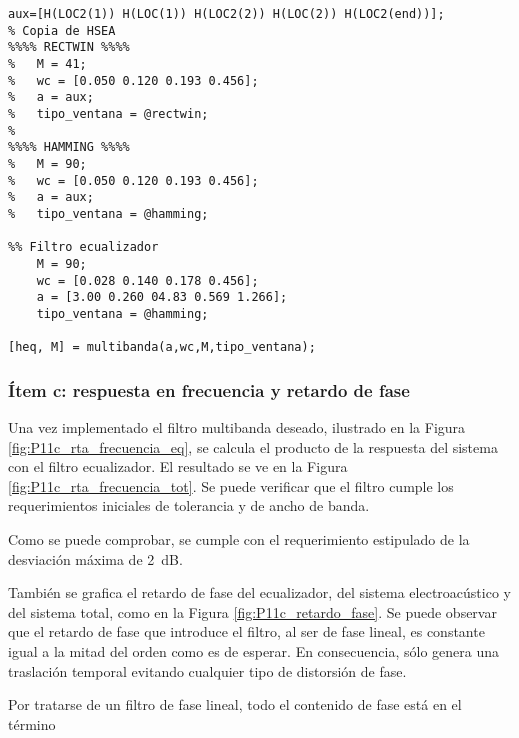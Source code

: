 
	\begin{lstlisting}
aux=[H(LOC2(1)) H(LOC(1)) H(LOC2(2)) H(LOC(2)) H(LOC2(end))];
% Copia de HSEA
%%%% RECTWIN %%%%
%	M = 41;
%	wc = [0.050 0.120 0.193 0.456];
%	a = aux;
%	tipo_ventana = @rectwin;
%
%%%% HAMMING %%%%
%	M = 90;
%	wc = [0.050 0.120 0.193 0.456];
%	a = aux;
%	tipo_ventana = @hamming;

%% Filtro ecualizador
	M = 90;
	wc = [0.028 0.140 0.178 0.456];
	a = [3.00 0.260 04.83 0.569 1.266];
	tipo_ventana = @hamming;

[heq, M] = multibanda(a,wc,M,tipo_ventana);
	\end{lstlisting}

	\subsubsection{Ítem c: respuesta en frecuencia y retardo de fase}
	
	Una vez implementado el filtro multibanda deseado, ilustrado en la Figura \ref{fig:P11c_rta_frecuencia_eq}, se calcula el producto de la respuesta del sistema con el filtro ecualizador. El resultado se ve en la Figura \ref{fig:P11c_rta_frecuencia_tot}. Se puede verificar que el filtro cumple los requerimientos iniciales de tolerancia y de ancho de banda. \\
	

	Como se puede comprobar, se cumple con el requerimiento estipulado de la desviación máxima de \SI{2}{\dB}.

	También se grafica el retardo de fase del ecualizador, del sistema electroacústico y del sistema total, como en la Figura \ref{fig:P11c_retardo_fase}. Se puede observar que el retardo de fase que introduce el filtro, al ser de fase lineal, es constante igual a la mitad del orden como es de esperar. En consecuencia, sólo genera una traslación temporal evitando cualquier tipo de distorsión de fase.
	
	
	Por tratarse de un filtro de fase lineal, todo el contenido de fase está en el término 
	{\color{red}{No entiendo esta oración y lo que quiere decir con la ecuación.... :S}}
	
